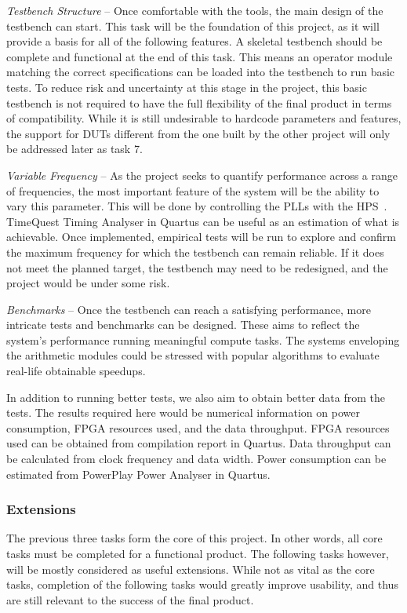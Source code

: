 \textit{Testbench Structure} --
Once comfortable with the tools, the main design of the testbench can start.
This task will be the foundation of this project, as it will provide a basis
for all of the following features.
A skeletal testbench should be complete and functional at the end of this
task.
This means an operator module matching the correct specifications can
be loaded into the testbench to run basic tests.
To reduce risk and uncertainty at this stage in the project, this basic
testbench is not required to have the full flexibility of the final product
in terms of compatibility.
While it is still undesirable to hardcode parameters and features,
the support for DUTs different from the one built by the other project will
only be addressed later as task 7.

\textit{Variable Frequency} --
As the project seeks to quantify performance across a range of frequencies,
the most important feature of the system will be the ability to vary this
parameter.
This will be done by controlling the PLLs with the HPS~\cite{Altera4}.
TimeQuest Timing Analyser in Quartus can be useful as an estimation of what is
achievable.
Once implemented, empirical tests will be run to explore and confirm the maximum
frequency for which the testbench can remain reliable.
If it does not meet the planned target, the testbench may need to be redesigned,
and the project would be under some risk.


\textit{Benchmarks} --
Once the testbench can reach a satisfying performance, more intricate tests and
benchmarks can be designed.
These aims to reflect the system's performance running meaningful compute
tasks.
The systems enveloping the arithmetic modules could be stressed with popular
algorithms to evaluate real-life obtainable speedups.

In addition to running better tests, we also aim to obtain better data from
the tests.
The results required here would be numerical information on power
consumption, FPGA resources used, and the data throughput.
FPGA resources used can be obtained from compilation report in Quartus.
Data throughput can be calculated from clock frequency and data width.
Power consumption can be estimated from PowerPlay Power Analyser in Quartus.

\subsubsection{Extensions}

The previous three tasks form the core of this project.
In other words, all core tasks must be completed for a functional product.
The following tasks however, will be mostly considered as useful extensions.
While not as vital as the core tasks, completion of the following tasks would
greatly improve usability, and thus are still relevant to the success
of the final product.

